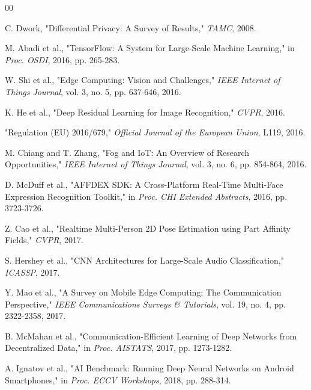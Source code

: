\documentclass[conference]{IEEEtran}
\begin{document}
\begin{thebibliography}{00}

 C. Dwork, "Differential Privacy: A Survey of Results," \textit{TAMC}, 2008.

 M. Abadi et al., "TensorFlow: A System for Large-Scale Machine Learning," in \textit{Proc. OSDI}, 2016, pp. 265-283.


 W. Shi et al., "Edge Computing: Vision and Challenges," \textit{IEEE Internet of Things Journal}, vol. 3, no. 5, pp. 637-646, 2016.


 K. He et al., "Deep Residual Learning for Image Recognition," \textit{CVPR}, 2016.

 "Regulation (EU) 2016/679," \textit{Official Journal of the European Union}, L119, 2016.

 M. Chiang and T. Zhang, "Fog and IoT: An Overview of Research Opportunities," \textit{IEEE Internet of Things Journal}, vol. 3, no. 6, pp. 854-864, 2016.


 D. McDuff et al., "AFFDEX SDK: A Cross-Platform Real-Time Multi-Face Expression Recognition Toolkit," in \textit{Proc. CHI Extended Abstracts}, 2016, pp. 3723-3726.


 Z. Cao et al., "Realtime Multi-Person 2D Pose Estimation using Part Affinity Fields," \textit{CVPR}, 2017.

 S. Hershey et al., "CNN Architectures for Large-Scale Audio Classification," \textit{ICASSP}, 2017.

 Y. Mao et al., "A Survey on Mobile Edge Computing: The Communication Perspective," \textit{IEEE Communications Surveys \& Tutorials}, vol. 19, no. 4, pp. 2322-2358, 2017.

 B. McMahan et al., "Communication-Efficient Learning of Deep Networks from Decentralized Data," in \textit{Proc. AISTATS}, 2017, pp. 1273-1282.


 A. Ignatov et al., "AI Benchmark: Running Deep Neural Networks on Android Smartphones," in \textit{Proc. ECCV Workshops}, 2018, pp. 288-314.


\end{thebibliography}
\end{document}
